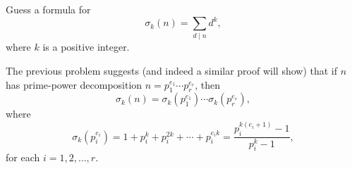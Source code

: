  Guess a formula for
\begin{equation*}
  \sigma_k(n) = \sum_{d\mid n}d^k,
\end{equation*}
where $k$ is a positive integer.
\begin{solution}
  The previous problem suggests (and indeed a similar proof will show)
  that if $n$ has prime-power decomposition
  $n = p_1^{e_1}\cdots p_r^{e_r}$, then
  \begin{equation*}
    \sigma_k(n) = \sigma_k(p_1^{e_1})\cdots\sigma_k(p_r^{e_r}),
  \end{equation*}
  where
  \begin{equation*}
    \sigma_k(p_i^{e_i})
    = 1 + p_i^k + p_i^{2k} + \cdots + p_i^{e_ik}
    = \frac{p_i^{k(e_i+1)} - 1}{p_i^k - 1},
  \end{equation*}
  for each $i = 1, 2, \dots, r$.
\end{solution}

